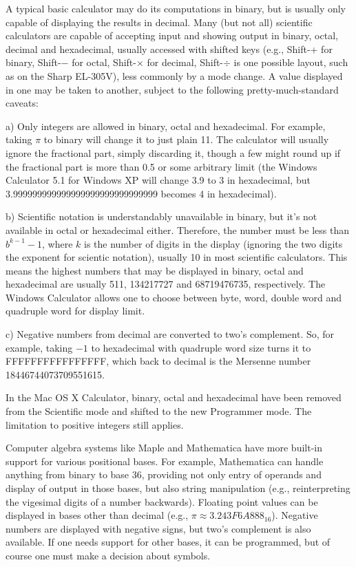 \documentclass[12pt]{article}
\begin{document}
A typical basic calculator may do its computations in binary, but is usually only capable of displaying the results in decimal. Many (but not all) scientific calculators are capable of accepting input and showing output in binary, octal, decimal and hexadecimal, usually accessed with shifted keys (e.g., Shift-+ for binary, Shift-$-$ for octal, Shift-$\times$ for decimal, Shift-$\div$ is one possible layout, such as on the Sharp EL-305V), less commonly by a mode change. A value displayed in one may be taken to another, subject to the following pretty-much-standard caveats:

a) Only integers are allowed in binary, octal and hexadecimal. For example, taking $\pi$ to binary will change it to just plain 11. The calculator will usually ignore the fractional part, simply discarding it, though a few might round up if the fractional part is more than 0.5 or some arbitrary limit (the Windows Calculator 5.1 for Windows XP will change 3.9 to 3 in hexadecimal, but 3.999999999999999999999999999999 becomes 4 in hexadecimal).

b) Scientific notation is understandably unavailable in binary, but it's not available in octal or hexadecimal either. Therefore, the number must be less than $b^{k - 1} - 1$, where $k$ is the number of digits in the display (ignoring the two digits the exponent for scientic notation), usually 10 in most scientific calculators. This means the highest numbers that may be displayed in binary, octal and hexadecimal are usually 511, 134217727 and 68719476735, respectively. The Windows Calculator allows one to choose between byte, word, double word and quadruple word for display limit.

c) Negative numbers from decimal are converted to two's complement. So, for example, taking $-1$ to hexadecimal with quadruple word size turns it to FFFFFFFFFFFFFFFF, which back to decimal is the Mersenne number 18446744073709551615.

In the Mac OS X Calculator, binary, octal and hexadecimal have been removed from the Scientific mode and shifted to the new Programmer mode. The limitation to positive integers still applies. %

Computer algebra systems like Maple and Mathematica have more built-in support for various positional bases. For example, Mathematica can handle anything from binary to base 36, providing not only entry of operands and display of output in those bases, but also string manipulation (e.g., reinterpreting the vigesimal digits of a number backwards). Floating point values can be displayed in bases other than decimal (e.g., $\pi \approx 3.243F6A888_{16}$). Negative numbers are displayed with negative signs, but two's complement is also available. If one needs support for other bases, it can be programmed, but of course one must make a decision about symbols.
\end{document}
